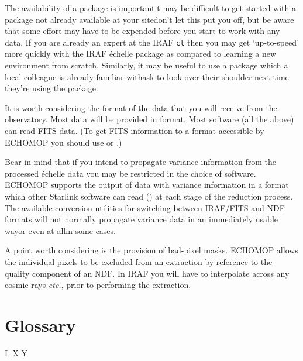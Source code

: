 The availability of a package is important\sgspec{---}{ - }it may be difficult
to get started with a package not already available at your
site\sgspec{---}{ - }don't let this put you off, but be aware that some effort
may have to be expended before you start to work with any data.
If you are already an expert at the IRAF {\tt cl} then you may get
`up-to-speed' more quickly with the IRAF \'{e}chelle package as compared
to learning a new environment from scratch.
Similarly, it may be useful to use a package which a local colleague is
already familiar with\sgspec{---}{ - }ask to look over their shoulder next
time they're using the package.

It is worth considering the format of the data that you will receive
from the observatory.  Most data will be provided in
 format.
Most software (all the above) can read FITS data.  (To get FITS information to
a format accessible by ECHOMOP you should use 
 or .)

Bear in mind that if you
intend to propagate variance information from the processed \'{e}chelle
data you may be restricted in the choice of software.  ECHOMOP supports
the output of data with variance information in a format which other
Starlink software can read () at each stage of the
reduction process.
The available conversion utilities for switching between IRAF/FITS and
NDF formats will not normally propagate variance data in an immediately
usable way\sgspec{---}{ - }or even at all\sgspec{---}{ - }in some cases.

A point worth considering is the provision of bad-pixel masks.
ECHOMOP allows the individual pixels to be excluded from an extraction
by reference to the quality component of an NDF\@.  In IRAF you will
have to interpolate across any cosmic rays {\em etc.}, prior to
performing the extraction.

\newpage
\section{\label{se_glossary}Glossary}

\begin{htmlonly}
L
X
Y
\end{htmlonly}

